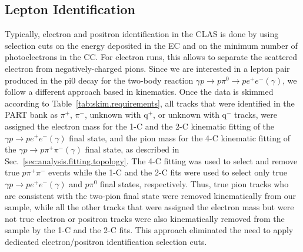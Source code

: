 \subsection{Lepton Identification}
	Typically, electron and positron identification in the CLAS is done by using selection cuts on the energy deposited in the EC and on the minimum number 
  of photoelectrons in the CC. For electron runs, this allows to separate the scattered electron from negatively-charged pions. Since we are interested in a 
  lepton pair produced in the pi0 decay for the two-body reaction $\gamma p\rightarrow p \pi^0 \rightarrow pe^+e^- (\gamma)$, we follow a different approach based in kinematics. 
  Once the data is skimmed according to Table~\ref{tab:skim.requirements}, all tracks that were identified in the PART bank as  $\pi^+$, $\pi^-$, unknown with q$^+$, or unknown with q$^-$ 
  tracks, were assigned the electron mass for the 1-C and the 2-C kinematic fitting of the $\gamma p\rightarrow pe^+e^- (\gamma)$ final state, and the pion mass for the 4-C 
  kinematic fitting of the $\gamma p\rightarrow p\pi^+\pi^- (\gamma)$ final state, as described in Sec.~\ref{sec:analysis.fitting.topology}. The 4-C fitting was used to select and remove true $p\pi^+\pi^-$ events while 
  the 1-C and the 2-C fits were used to select only true $\gamma p\rightarrow pe^+e^- (\gamma)$ and $p\pi^0$ final states, respectively. Thus, true pion tracks who are consistent with the 
  two-pion final state were removed kinematically from our sample, while all the other tracks that were assigned the electron mass but were not true 
  electron or positron tracks were also kinematically removed from the sample by the 1-C and the 2-C fits. This approach eliminated the need to apply 
  dedicated electron/positron identification selection cuts.
   
   
	
